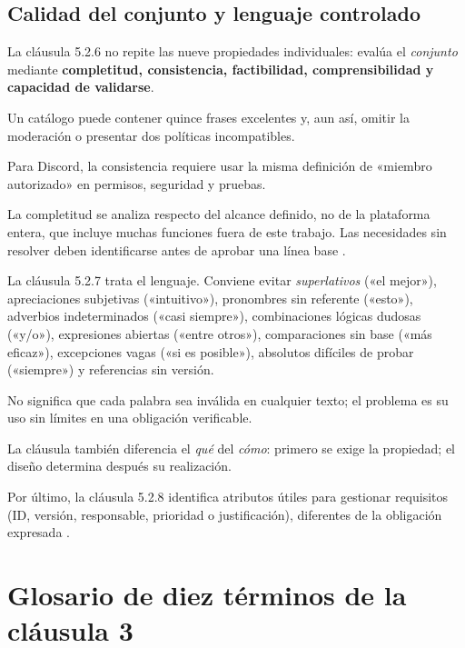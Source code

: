 \documentclass[12pt,a4paper]{article}
\begin{document}
\subsection{Calidad del conjunto y lenguaje controlado}

La cláusula 5.2.6 no repite las nueve propiedades individuales: evalúa el \emph{conjunto} mediante \textbf{completitud, consistencia, factibilidad, comprensibilidad y capacidad de validarse}.

Un catálogo puede contener quince frases excelentes y, aun así, omitir la moderación o presentar dos políticas incompatibles.

Para Discord, la consistencia requiere usar la misma definición de «miembro autorizado» en permisos, seguridad y pruebas.

La completitud se analiza respecto del alcance definido, no de la plataforma entera, que incluye muchas funciones fuera de este trabajo. Las necesidades sin resolver deben identificarse antes de aprobar una línea base \cite[cláusula~5.2.6]{iso29148}.

La cláusula 5.2.7 trata el lenguaje. Conviene evitar \emph{superlativos} («el mejor»), apreciaciones subjetivas («intuitivo»), pronombres sin referente («esto»), adverbios indeterminados («casi siempre»), combinaciones lógicas dudosas («y/o»), expresiones abiertas («entre otros»), comparaciones sin base («más eficaz»), excepciones vagas («si es posible»), absolutos difíciles de probar («siempre») y referencias sin versión.

No significa que cada palabra sea inválida en cualquier texto; el problema es su uso sin límites en una obligación verificable.

La cláusula también diferencia el \emph{qué} del \emph{cómo}: primero se exige la propiedad; el diseño determina después su realización.

Por último, la cláusula 5.2.8 identifica atributos útiles para gestionar requisitos (ID, versión, responsable, prioridad o justificación), diferentes de la obligación expresada \cite{iso29148,pohl2025}.


\section{Glosario de diez términos de la cláusula 3}
\end{document}
